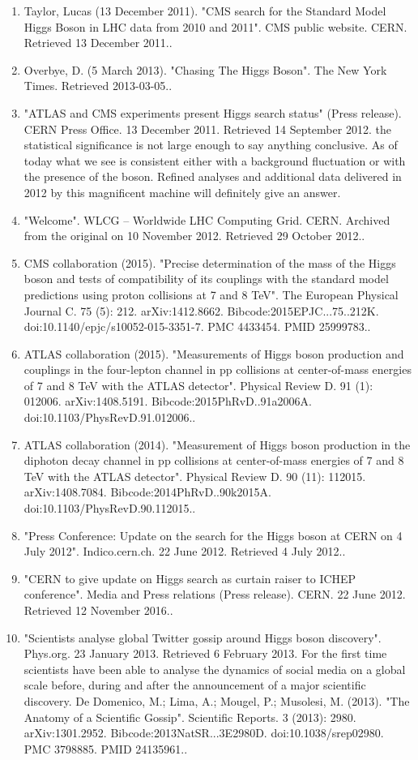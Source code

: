 \begin{enumerate}
    \item Taylor, Lucas (13 December 2011). "CMS search for the Standard Model Higgs Boson in LHC data from 2010 and 2011". CMS public website. CERN. Retrieved 13 December 2011..
    \item Overbye, D. (5 March 2013). "Chasing The Higgs Boson". The New York Times. Retrieved 2013-03-05..
    \item "ATLAS and CMS experiments present Higgs search status" (Press release). CERN Press Office. 13 December 2011. Retrieved 14 September 2012. the statistical significance is not large enough to say anything conclusive. As of today what we see is consistent either with a background fluctuation or with the presence of the boson. Refined analyses and additional data delivered in 2012 by this magnificent machine will definitely give an answer.
    \item "Welcome". WLCG – Worldwide LHC Computing Grid. CERN. Archived from the original on 10 November 2012. Retrieved 29 October 2012..
    \item CMS collaboration (2015). "Precise determination of the mass of the Higgs boson and tests of compatibility of its couplings with the standard model predictions using proton collisions at 7 and 8 TeV". The European Physical Journal C. 75 (5): 212. arXiv:1412.8662. Bibcode:2015EPJC...75..212K. doi:10.1140/epjc/s10052-015-3351-7. PMC 4433454. PMID 25999783..
    \item ATLAS collaboration (2015). "Measurements of Higgs boson production and couplings in the four-lepton channel in pp collisions at center-of-mass energies of 7 and 8 TeV with the ATLAS detector". Physical Review D. 91 (1): 012006. arXiv:1408.5191. Bibcode:2015PhRvD..91a2006A. doi:10.1103/PhysRevD.91.012006..
    \item ATLAS collaboration (2014). "Measurement of Higgs boson production in the diphoton decay channel in pp collisions at center-of-mass energies of 7 and 8 TeV with the ATLAS detector". Physical Review D. 90 (11): 112015. arXiv:1408.7084. Bibcode:2014PhRvD..90k2015A. doi:10.1103/PhysRevD.90.112015..
    \item "Press Conference: Update on the search for the Higgs boson at CERN on 4 July 2012". Indico.cern.ch. 22 June 2012. Retrieved 4 July 2012..
    \item "CERN to give update on Higgs search as curtain raiser to ICHEP conference". Media and Press relations (Press release). CERN. 22 June 2012. Retrieved 12 November 2016..
    \item "Scientists analyse global Twitter gossip around Higgs boson discovery". Phys.org. 23 January 2013. Retrieved 6 February 2013. For the first time scientists have been able to analyse the dynamics of social media on a global scale before, during and after the announcement of a major scientific discovery. De Domenico, M.; Lima, A.; Mougel, P.; Musolesi, M. (2013). "The Anatomy of a Scientific Gossip". Scientific Reports. 3 (2013): 2980. arXiv:1301.2952. Bibcode:2013NatSR...3E2980D. doi:10.1038/srep02980. PMC 3798885. PMID 24135961..

\end{enumerate}
